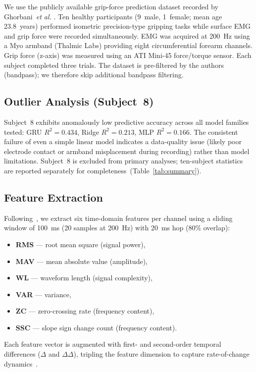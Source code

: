 \documentclass[journal]{IEEEtran}
\begin{document}
We use the publicly available grip-force prediction dataset
\cite{ghorbani2023dataset} recorded by Ghorbani~\emph{et al.}
\cite{ghorbani2023estimation}.  Ten healthy participants (9~male,
1~female; mean age 23.8~years) performed isometric precision-type gripping
tasks while surface EMG and grip force were recorded simultaneously.
EMG was acquired at 200~Hz using a Myo armband (Thalmic Labs) providing
eight circumferential forearm channels.  Grip force (z-axis) was measured
using an ATI Mini-45 force/torque sensor.  Each subject completed three
trials.  The dataset is pre-filtered by the authors (bandpass); we
therefore skip additional bandpass filtering.

\subsection{Outlier Analysis (Subject~8)}

Subject~8 exhibits anomalously low predictive accuracy across all model
families tested: GRU $R^2 = 0.434$, Ridge $R^2 = 0.213$, MLP
$R^2 = 0.166$.  The consistent failure of even a simple linear model
indicates a data-quality issue (likely poor electrode contact or armband
misplacement during recording) rather than model limitations.  Subject~8
is excluded from primary analyses; ten-subject statistics are reported
separately for completeness~(Table~\ref{tab:summary}).

\subsection{Feature Extraction}

Following~\cite{phinyomark2012feature}, we extract six time-domain
features per channel using a sliding window of 100~ms (20 samples at
200~Hz) with 20~ms hop (80\% overlap):
\begin{itemize}
  \item \textbf{RMS} --- root mean square (signal power),
  \item \textbf{MAV} --- mean absolute value (amplitude),
  \item \textbf{WL}  --- waveform length (signal complexity),
  \item \textbf{VAR} --- variance,
  \item \textbf{ZC}  --- zero-crossing rate (frequency content),
  \item \textbf{SSC} --- slope sign change count (frequency content).
\end{itemize}
Each feature vector is augmented with first- and second-order temporal
differences ($\Delta$ and $\Delta\Delta$), tripling the feature dimension
to capture rate-of-change dynamics~\cite{zardoshti1995emg}.
\end{document}
